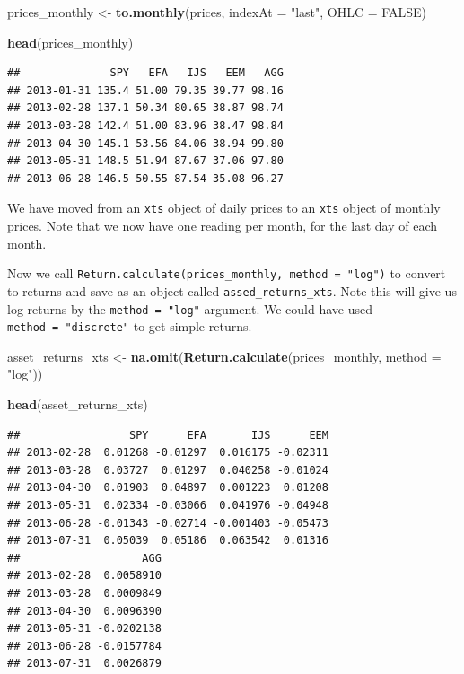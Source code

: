 \documentclass[]{krantz}
\makeatletter
\newenvironment{Shaded}{\begin{snugshade}}{\end{snugshade}}
\newcommand{\KeywordTok}[1]{\textcolor[rgb]{0.13,0.29,0.53}{\textbf{#1}}}
\newcommand{\DataTypeTok}[1]{\textcolor[rgb]{0.13,0.29,0.53}{#1}}
\newcommand{\StringTok}[1]{\textcolor[rgb]{0.31,0.60,0.02}{#1}}
\newcommand{\OtherTok}[1]{\textcolor[rgb]{0.56,0.35,0.01}{#1}}
\newcommand{\NormalTok}[1]{#1}
\newenvironment{kframe}{%
\medskip{}
\setlength{\fboxsep}{.8em}
 \def\at@end@of@kframe{}%
 \ifinner\ifhmode%
  \def\at@end@of@kframe{\end{minipage}}%
  \begin{minipage}{\columnwidth}%
 \fi\fi%
 \def\FrameCommand##1{\hskip\@totalleftmargin \hskip-\fboxsep
 \colorbox{shadecolor}{##1}\hskip-\fboxsep
     \hskip-\linewidth \hskip-\@totalleftmargin \hskip\columnwidth}%
 \MakeFramed {\advance\hsize-\width
   \@totalleftmargin\z@ \linewidth\hsize
   \@setminipage}}%
 {\par\unskip\endMakeFramed%
 \at@end@of@kframe}
\renewenvironment{Shaded}{\begin{kframe}}{\end{kframe}}
\makeatother
\begin{document}
\begin{Shaded}
\begin{Highlighting}[]
\NormalTok{prices_monthly <-}\StringTok{ }\KeywordTok{to.monthly}\NormalTok{(prices, }\DataTypeTok{indexAt =} \StringTok{"last"}\NormalTok{, }\DataTypeTok{OHLC =} \OtherTok{FALSE}\NormalTok{)}

\KeywordTok{head}\NormalTok{(prices_monthly)}
\end{Highlighting}
\end{Shaded}

\begin{verbatim}
##              SPY   EFA   IJS   EEM   AGG
## 2013-01-31 135.4 51.00 79.35 39.77 98.16
## 2013-02-28 137.1 50.34 80.65 38.87 98.74
## 2013-03-28 142.4 51.00 83.96 38.47 98.84
## 2013-04-30 145.1 53.56 84.06 38.94 99.80
## 2013-05-31 148.5 51.94 87.67 37.06 97.80
## 2013-06-28 146.5 50.55 87.54 35.08 96.27
\end{verbatim}

We have moved from an \texttt{xts} object of daily prices to an
\texttt{xts} object of monthly prices. Note that we now have one reading
per month, for the last day of each month.

Now we call
\texttt{Return.calculate(prices\_monthly,\ method\ =\ "log")} to convert
to returns and save as an object called \texttt{assed\_returns\_xts}.
Note this will give us log returns by the \texttt{method\ =\ "log"}
argument. We could have used \texttt{method\ =\ "discrete"} to get
simple returns.

\begin{Shaded}
\begin{Highlighting}[]
\NormalTok{asset_returns_xts <-}\StringTok{ }\KeywordTok{na.omit}\NormalTok{(}\KeywordTok{Return.calculate}\NormalTok{(prices_monthly, }\DataTypeTok{method =} \StringTok{"log"}\NormalTok{))}

\KeywordTok{head}\NormalTok{(asset_returns_xts)}
\end{Highlighting}
\end{Shaded}

\begin{verbatim}
##                 SPY      EFA       IJS      EEM
## 2013-02-28  0.01268 -0.01297  0.016175 -0.02311
## 2013-03-28  0.03727  0.01297  0.040258 -0.01024
## 2013-04-30  0.01903  0.04897  0.001223  0.01208
## 2013-05-31  0.02334 -0.03066  0.041976 -0.04948
## 2013-06-28 -0.01343 -0.02714 -0.001403 -0.05473
## 2013-07-31  0.05039  0.05186  0.063542  0.01316
##                   AGG
## 2013-02-28  0.0058910
## 2013-03-28  0.0009849
## 2013-04-30  0.0096390
## 2013-05-31 -0.0202138
## 2013-06-28 -0.0157784
## 2013-07-31  0.0026879
\end{verbatim}
\end{document}
